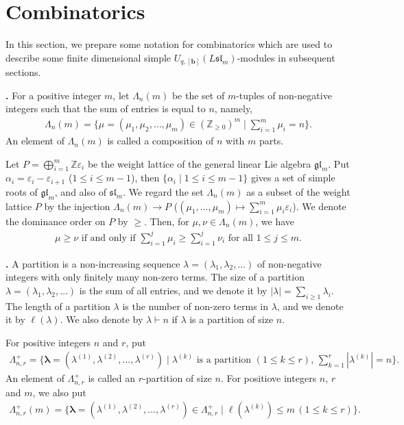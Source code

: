\documentclass[12pt]{amsart}
\def \para{\refstepcounter{thm} \par\medskip\noindent
                \textbf{\thethm .} }
\numberwithin{equation}{thm}
\newcommand\ZZ{\mathbb Z}
\newcommand\bb{\mathbf b}
\renewcommand\a{\alpha}  %
\newcommand\la{\lambda}
\newcommand\ve{\varepsilon}
\newcommand\vL{\varLambda}
\newcommand\Bla{\boldsymbol\lambda}
\newcommand\ra{\rightarrow}
\newcommand\Fgl{\mathfrak{gl}}
\newcommand\Fsl{\mathfrak{sl}}
\newcounter{ni}
\newcounter{go}
\begin{document}


\section{Combinatorics} 
\label{comb}
In this section, we prepare some notation for combinatorics which are used to describe 
some finite dimensional simple $U_{q,[\bb]}(L\Fsl_m)$-modules in subsequent sections. 

\para 
For a positive integer $m$, 
let $\vL_n(m)$ be the set of $m$-tuples of non-negative integers such that the sum of entries is equal to $n$, 
namely, 
\begin{align*}
\vL_n (m) = \{ \mu = (\mu_1,\mu_2, \dots, \mu_m) \in (\ZZ_{\geq 0})^m \mid \sum_{i=1}^m \mu_i =n\}. 
\end{align*}
An element of $\vL_n(m)$ is called a composition of $n$ with $m$ parts. 

Let $P= \bigoplus_{i=1}^m \ZZ \ve_i$ be the weight lattice of the general linear Lie algebra $\Fgl_m$. 
Put $\a_i = \ve_i - \ve_{i+1}$ ($1\leq i \leq m-1$), 
then $\{\a_i \mid 1 \leq i \leq m-1\}$ gives a set of simple roots of $\Fgl_m$, and also of $\Fsl_m$. 
We regard the set $\vL_n(m)$ as a subset of the weight lattice $P$ by the injection 
$\vL_n(m) \ra P$ ($(\mu_1,\dots, \mu_m) \mapsto \sum_{i=1}^m \mu_i \ve_i$). 
We denote the dominance order on $P$ by $\geq$. Then, for $\mu,\nu \in \vL_n(m)$,  we have 
\begin{align*}
\mu \geq \nu \text{ if and only if }
\sum_{i=1}^j \mu_i \geq \sum_{i=1}^j \nu_i \text{ for all } 1 \leq j \leq m. 
\end{align*}
\para 
A partition is  a non-increasing sequence $\la =(\la_1, \la_2, \dots )$ of non-negative integers with only finitely many non-zero terms. 
The size of a partition $\la =(\la_1,\la_2, \dots)$ is the sum of all entries, and we denote it by $|\la| = \sum_{i \geq 1} \la_i$. 
The length of a partition $\la$ is the number of non-zero terms in $\la$, and we denote it by $\ell (\la)$. 
We also denote by $\la \vdash n$ if $\la$ is a partition of  size $n$. 

For positive integers $n$ and $r$, put 
\begin{align*}
\vL_{n,r}^+ = \{ \Bla = (\la^{(1)}, \la^{(2)}, \dots, \la^{(r)}) \mid \la^{(k)} \text{ is a partition } (1 \leq k \leq r), \, 
	\sum_{k=1}^r |\la^{(k)}| =n \}.
\end{align*}
An element of $\vL_{n,r}^+$ is called an $r$-partition of size $n$. 
For positiove integers $n$, $r$ and $m$, we also put 
\begin{align*}
\vL_{n,r}^+ (m) = \{\Bla=(\la^{(1)}, \la^{(2)}, \dots, \la^{(r)}) \in \vL_{n,r}^+ \mid \ell (\la^{(k)}) \leq m \, (1 \leq k \leq r)\}.
\end{align*}
\end{document}
